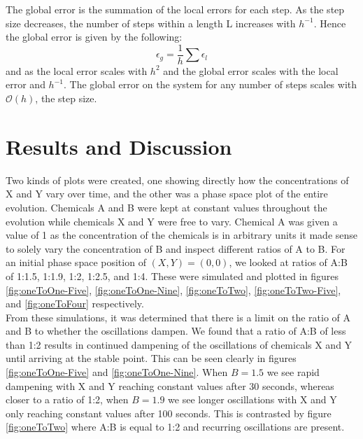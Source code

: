 \documentclass[reprint, amsmath, amssymb, aps]{revtex4-2}
\begin{document}
The global error is the summation of the local errors for each step. As the step size decreases, the number of steps within a length L increases with $h^{-1}$. Hence the global error is given by the following:
\begin{equation}
	\epsilon_g = \frac{1}{h} \sum \epsilon_l
\end{equation}and as the local error scales with $h^2$ and the global error scales with the local error and $h^{-1}$. The global error on the system for any number of steps scales with $\mathcal{O}(h)$, the step size.

\section{Results and Discussion}
Two kinds of plots were created, one showing directly how the concentrations of X and Y vary over time, and the other was a phase space plot of the entire evolution. Chemicals A and B were kept at constant values throughout the evolution while chemicals X and Y were free to vary. Chemical A was given a value of 1 as the concentration of the chemicals is in arbitrary units it made sense to solely vary the concentration of B and inspect different ratios of A to B. For an initial phase space position of $(X, Y) = (0, 0)$, we looked at ratios of A:B of 1:1.5, 1:1.9, 1:2, 1:2.5, and 1:4. These were simulated and plotted in figures \ref{fig:oneToOne-Five}, \ref{fig:oneToOne-Nine}, \ref{fig:oneToTwo}, \ref{fig:oneToTwo-Five}, and \ref{fig:oneToFour} respectively.\\

From these simulations, it was determined that there is a limit on the ratio of A and B to whether the oscillations dampen. We found that a ratio of A:B of less than 1:2 results in continued dampening of the oscillations of chemicals X and Y until arriving at the stable point. This can be seen clearly in figures \ref{fig:oneToOne-Five} and \ref{fig:oneToOne-Nine}. When $B=1.5$ we see rapid dampening with X and Y reaching constant values after 30 seconds, whereas closer to a ratio of 1:2, when $B=1.9$ we see longer oscillations with X and Y only reaching constant values after 100 seconds. This is contrasted by figure \ref{fig:oneToTwo} where A:B is equal to 1:2 and recurring oscillations are present.\\
\end{document}
